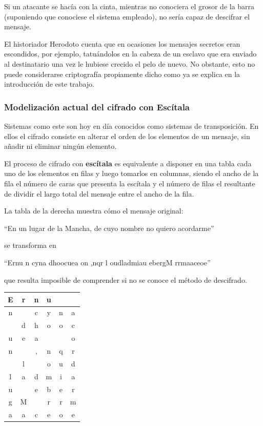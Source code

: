 \documentclass[nochap]{apuntesURJC}
\begin{document}
Si un atacante se hacía con la cinta, mientras no conociera el grosor de la barra (suponiendo que conociese el sistema empleado), no sería capaz de descifrar el mensaje.

El historiador Herodoto cuenta que en ocasiones los mensajes secretos eran escondidos, por ejemplo, tatuándolos en la cabeza de un esclavo que era enviado al destinatario una vez le hubiese crecido el pelo de nuevo. No obstante, esto no puede considerarse criptografía propiamente dicho como ya se explica en la introducción de este trabajo.

\subsubsection{Modelización actual del cifrado con Escítala}
Sistemas como este son hoy en día conocidos como sistemas de transposición. En ellos el cifrado consiste en alterar el orden de los elementos de un mensaje, sin añadir ni eliminar ningún elemento.

El proceso de cifrado con \textbf{escítala} es equivalente a disponer en una tabla cada uno de los elementos en filas y luego tomarlos en columnas, siendo el ancho de la fila el número de caras que presenta la escítala y el número de filas el resultante de dividir el largo total del mensaje entre el ancho de la fila.

\begin{minipage}{0.65\textwidth}
La tabla de la derecha muestra cómo el mensaje original:
\begin{center}
``En un lugar de la Mancha, de cuyo nombre no quiero acordarme''
\end{center}
se transforma en
\begin{center}
``Ernu  n cyna dhoocuea  on ,nqr l oudladmiau ebergM rrmaaceoe''
\end{center}
que resulta imposible de comprender si no se conoce el método de descifrado.

\end{minipage}
\begin{minipage}{0.3\textwidth}

\end{minipage}
\begin{minipage}{0.30\textwidth}
\begin{center}
\begin{tabular}{|c|c|c|c|c|c|}
\hline
E & r & n & u &   &   \\
\hline
n &   & c & y & n & a \\
\hline
  & d & h & o & o & c \\
\hline
u & e & a &   &   & o \\
\hline
n &   & , & n & q & r \\
\hline
  & l &   & o & u & d \\
\hline
l & a & d & m & i & a \\
\hline
u &   & e & b & e & r \\
\hline
g & M &   & r & r & m \\
\hline
a & a & c & e & o & e \\
\hline
\end{tabular}
\end{center}
\end{minipage}
\end{document}
